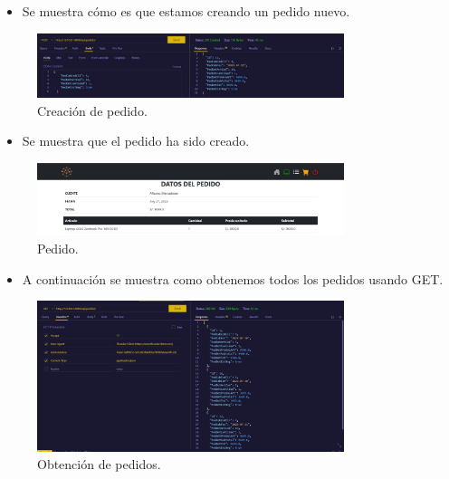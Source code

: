 \documentclass{article}
\begin{document}
    \begin{itemize}
        \item Se muestra cómo es que estamos creando un pedido nuevo.
    \end{itemize}
    \begin{figure}[H]
		\centering
        \includegraphics[width=0.8\textwidth,keepaspectratio]{img/b18.jpeg}
		\caption{Creación de pedido.}
    \end{figure}
    \begin{itemize}
        \item Se muestra que el pedido ha sido creado.
    \end{itemize}
    \begin{figure}[H]
		\centering
        \includegraphics[width=0.8\textwidth,keepaspectratio]{img/b19.jpeg}
		\caption{Pedido.}
    \end{figure}
    \begin{itemize}
        \item A continuación se muestra como obtenemos todos los pedidos usando GET.
    \end{itemize}
    \begin{figure}[H]
		\centering
        \includegraphics[width=0.8\textwidth,keepaspectratio]{img/b20.jpeg}
		\caption{Obtención de pedidos.}
    \end{figure}
\end{document}

